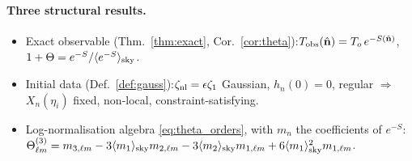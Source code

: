 \paragraph{Three structural results.}
\begin{itemize}\itemsep1pt
\item[(a)] Exact observable (Thm.~\ref{thm:exact}, Cor.~\ref{cor:theta}):\quad $T_{\rm obs}(\hat{\mathbf n})=T_o\,e^{-S(\hat{\mathbf n})}$,\quad $1+\Theta=e^{-S}/\langle e^{-S}\rangle_{\rm sky}$.
\item[(b)] Initial data (Def.~\ref{def:gauss}):\quad $\zeta_{\rm nl}=\epsilon\zeta_1$ Gaussian, $h_n(0)=0$, regular $\Rightarrow$ $X_n(\eta_i)$ fixed, non-local, constraint-satisfying.
\item[(c)] Log-normalisation algebra \eqref{eq:theta_orders}, with $m_n$ the coefficients of $e^{-S}$:
$\Theta^{(3)}_{\ell m}=m_{3,\ell m}-3\langle m_1\rangle_{\rm sky}m_{2,\ell m}-3\langle m_2\rangle_{\rm sky}m_{1,\ell m}+6\langle m_1\rangle_{\rm sky}^2m_{1,\ell m}$.
\end{itemize}

